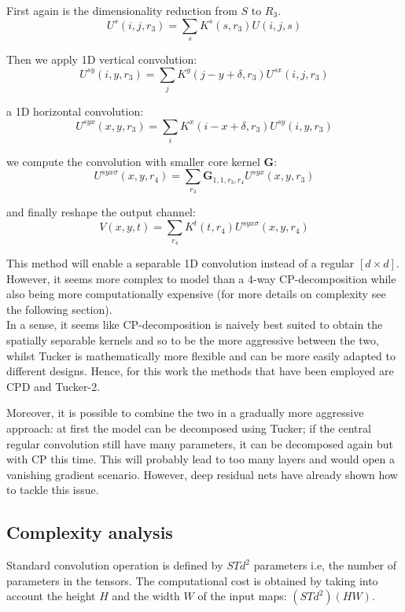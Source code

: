 First again is the dimensionality reduction from $S$ to $R_3$. 
\begin{equation}
    U^s(i,j,r_3) = \sum_s K^s(s, r_3) U(i,j,s)
\end{equation}

Then we apply 1D vertical convolution: 
\begin{equation}
        U^{sy}(i,y,r_3) = \sum_j K^y(j-y+\delta, r_3) U^{sx}(i,j,r_3)
\end{equation}

a 1D horizontal convolution: 
\begin{equation}
    U^{syx}(x,y,r_3) = \sum_i K^x(i-x+\delta, r_3) U^{sy}(i,y,r_3)
\end{equation}

we compute the convolution with smaller core kernel $\mathbf{G}$:
\begin{equation}
U^{syx\sigma}(x,y,r_4) = \sum_{r_3} \mathbf{G}_{1,1,r_3,r_4} U^{syx}(x,y,r_3)
\end{equation}

and finally reshape the output channel:
\begin{equation}
    V(x, y,t) = \sum_{r_4} K^t(t, r_4)U^{syx\sigma}(x,y,r_4)
\end{equation}

This method will enable a separable 1D convolution instead of a regular $[d \times d]$. However, it seems more complex to model than a 4-way CP-decomposition while also being more computationally expensive (for more details on complexity see the following section). \\
In a sense, it seems like CP-decomposition is naively best suited to obtain the spatially separable kernels and so to be the more aggressive between the two, whilst Tucker is mathematically more flexible and can be more easily adapted to different designs. Hence, for this work the methods that have been employed are CPD and Tucker-2. 
\newline 

Moreover, it is possible to combine the two in a gradually more aggressive approach: at first the model can be decomposed using Tucker; if the central regular convolution still have many parameters, it can be decomposed again but with CP this time. This will probably lead to too many layers and would open a vanishing gradient scenario. However, deep residual nets\parencite{resnet} have already shown how to tackle this issue. 


\pagebreak
\subsection{Complexity analysis}
\label{subsec:complexity}
Standard convolution operation is defined by $STd^2$ parameters i.e, the number of parameters in the tensors. The computational cost is obtained by taking into account the height $H$ and the width $W$ of the input maps: $(STd^2)(HW)$. 

